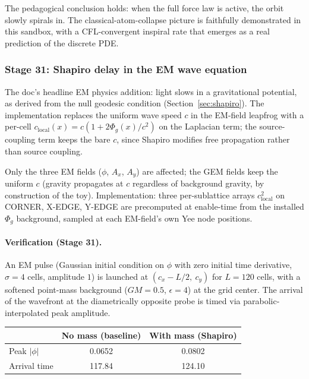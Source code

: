 \documentclass[11pt,a4paper]{article}
\newcommand{\Phig}{\Phi_g}
\begin{document}
The pedagogical conclusion holds: when the full force law is active,
the orbit slowly spirals in.  The classical-atom-collapse picture is
faithfully demonstrated in this sandbox, with a CFL-convergent inspiral
rate that emerges as a real prediction of the discrete PDE.

\subsubsection{Stage 31: Shapiro delay in the EM wave equation}
\label{sec:stage_shapiro_delay}

The doc's headline EM physics addition: light slows in a gravitational
potential, as derived from the null geodesic condition
(Section~\ref{sec:shapiro}).  The implementation replaces the uniform
wave speed $c$ in the EM-field leapfrog with a per-cell
$c_{\mathrm{local}}(x) = c (1 + 2 \Phig(x) / c^2)$ on the Laplacian
term; the source-coupling term keeps the bare $c$, since Shapiro
modifies free propagation rather than source coupling.

Only the three EM fields ($\phi$, $A_x$, $A_y$) are affected; the GEM
fields keep the uniform $c$ (gravity propagates at $c$ regardless of
background gravity, by construction of the toy).  Implementation:
three per-sublattice arrays $c_{\mathrm{local}}^2$ on CORNER, X-EDGE,
Y-EDGE are precomputed at enable-time from the installed $\Phig$
background, sampled at each EM-field's own Yee node positions.

\paragraph{Verification (Stage 31).}  An EM pulse (Gaussian initial
condition on $\phi$ with zero initial time derivative, $\sigma = 4$
cells, amplitude $1$) is launched at $(c_x - L/2,\ c_y)$ for $L = 120$
cells, with a softened point-mass background ($GM = 0.5$, $\epsilon = 4$)
at the grid center.  The arrival of the wavefront at the diametrically
opposite probe is timed via parabolic-interpolated peak amplitude.

\begin{center}
\begin{tabular}{@{}lcc@{}}
\toprule
                    & \textbf{No mass (baseline)} & \textbf{With mass (Shapiro)} \\
\midrule
Peak $|\phi|$       & 0.0652  & 0.0802 \\
Arrival time        & 117.84  & 124.10 \\
\bottomrule
\end{tabular}
\end{center}
\end{document}
